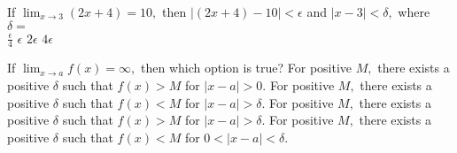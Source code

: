 \begin{question}
If \(\lim_{x \to 3} (2x + 4) = 10,\) then \(|(2x + 4) - 10| < \epsilon\) and \(|x - 3| < \delta,\) where \(\delta =\) \\
\choicesline
{\(\frac{\epsilon}{4}\)}
{}
{\(\epsilon\)}
{\(2 \epsilon\)}
{\(4 \epsilon\)}
\end{question}

\begin{question}
If \(\lim_{x \to a} f(x) = \infty,\) then which option is true?
\choices
{For positive \(M,\) there exists a positive \(\delta\) such that \(f(x) > M\) for \(|x - a| > 0.\)}
{For positive \(M,\) there exists a positive \(\delta\) such that \(f(x) < M\) for \(|x - a| > \delta.\)}
{For positive \(M,\) there exists a positive \(\delta\) such that \(f(x) > M\) for \(|x - a| > \delta.\)}
{For positive \(M,\) there exists a positive \(\delta\) such that \(f(x) < M\) for \(0 < |x - a| < \delta.\)}
{}
\end{question}
